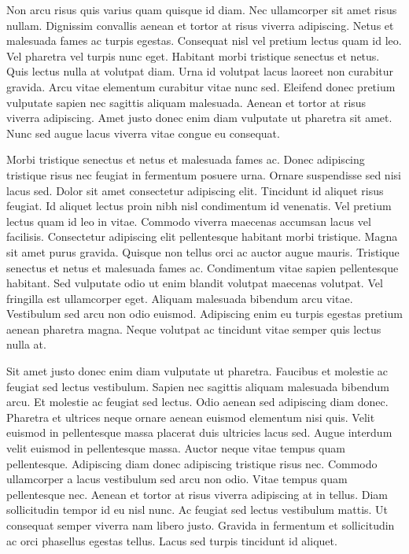 \documentclass[11pt,a4paper]{article}
\begin{document}
Non arcu risus quis varius quam quisque id diam. Nec ullamcorper sit amet risus nullam. Dignissim convallis aenean et tortor at risus viverra adipiscing. Netus et malesuada fames ac turpis egestas. Consequat nisl vel pretium lectus quam id leo. Vel pharetra vel turpis nunc eget. Habitant morbi tristique senectus et netus. Quis lectus nulla at volutpat diam. Urna id volutpat lacus laoreet non curabitur gravida. Arcu vitae elementum curabitur vitae nunc sed. Eleifend donec pretium vulputate sapien nec sagittis aliquam malesuada. Aenean et tortor at risus viverra adipiscing. Amet justo donec enim diam vulputate ut pharetra sit amet. Nunc sed augue lacus viverra vitae congue eu consequat.

Morbi tristique senectus et netus et malesuada fames ac. Donec adipiscing tristique risus nec feugiat in fermentum posuere urna. Ornare suspendisse sed nisi lacus sed. Dolor sit amet consectetur adipiscing elit. Tincidunt id aliquet risus feugiat. Id aliquet lectus proin nibh nisl condimentum id venenatis. Vel pretium lectus quam id leo in vitae. Commodo viverra maecenas accumsan lacus vel facilisis. Consectetur adipiscing elit pellentesque habitant morbi tristique. Magna sit amet purus gravida. Quisque non tellus orci ac auctor augue mauris. Tristique senectus et netus et malesuada fames ac. Condimentum vitae sapien pellentesque habitant. Sed vulputate odio ut enim blandit volutpat maecenas volutpat. Vel fringilla est ullamcorper eget. Aliquam malesuada bibendum arcu vitae. Vestibulum sed arcu non odio euismod. Adipiscing enim eu turpis egestas pretium aenean pharetra magna. Neque volutpat ac tincidunt vitae semper quis lectus nulla at.

Sit amet justo donec enim diam vulputate ut pharetra. Faucibus et molestie ac feugiat sed lectus vestibulum. Sapien nec sagittis aliquam malesuada bibendum arcu. Et molestie ac feugiat sed lectus. Odio aenean sed adipiscing diam donec. Pharetra et ultrices neque ornare aenean euismod elementum nisi quis. Velit euismod in pellentesque massa placerat duis ultricies lacus sed. Augue interdum velit euismod in pellentesque massa. Auctor neque vitae tempus quam pellentesque. Adipiscing diam donec adipiscing tristique risus nec. Commodo ullamcorper a lacus vestibulum sed arcu non odio. Vitae tempus quam pellentesque nec. Aenean et tortor at risus viverra adipiscing at in tellus. Diam sollicitudin tempor id eu nisl nunc. Ac feugiat sed lectus vestibulum mattis. Ut consequat semper viverra nam libero justo. Gravida in fermentum et sollicitudin ac orci phasellus egestas tellus. Lacus sed turpis tincidunt id aliquet.
\end{document}

